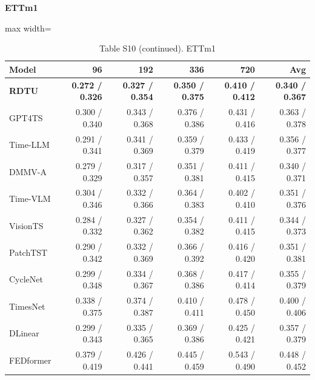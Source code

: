 \begin{table}[H]\centering\small
\caption*{Table S10 (continued). ETTm1}
\textbf{ETTm1}\par\smallskip
\begin{adjustbox}{max width=\linewidth}\begin{tabular}{lrrrrr}\toprule
\textbf{Model} & \textbf{96} & \textbf{192} & \textbf{336} & \textbf{720} & \textbf{Avg}\\\midrule
\rowcolor{blue!5}
\textbf{RDTU} & \textbf{0.272 / 0.326} & \textbf{0.327 / 0.354} & \textbf{0.350 / 0.375} & \textbf{0.410 / 0.412} & \textbf{0.340 / 0.367}\\
GPT4TS & 0.300 / 0.340 & 0.343 / 0.368 & 0.376 / 0.386 & 0.431 / 0.416 & 0.363 / 0.378\\
Time-LLM & 0.291 / 0.341 & 0.341 / 0.369 & 0.359 / 0.379 & 0.433 / 0.419 & 0.356 / 0.377\\
DMMV-A & 0.279 / 0.329 & 0.317 / 0.357 & 0.351 / 0.381 & 0.411 / 0.415 & 0.340 / 0.371\\
Time-VLM & 0.304 / 0.346 & 0.332 / 0.366 & 0.364 / 0.383 & 0.402 / 0.410 & 0.351 / 0.376\\
VisionTS & 0.284 / 0.332 & 0.327 / 0.362 & 0.354 / 0.382 & 0.411 / 0.415 & 0.344 / 0.373\\
PatchTST & 0.290 / 0.342 & 0.332 / 0.369 & 0.366 / 0.392 & 0.416 / 0.420 & 0.351 / 0.381\\
CycleNet & 0.299 / 0.348 & 0.334 / 0.367 & 0.368 / 0.386 & 0.417 / 0.414 & 0.355 / 0.379\\
TimesNet & 0.338 / 0.375 & 0.374 / 0.387 & 0.410 / 0.411 & 0.478 / 0.450 & 0.400 / 0.406\\
DLinear & 0.299 / 0.343 & 0.335 / 0.365 & 0.369 / 0.386 & 0.425 / 0.421 & 0.357 / 0.379\\
FEDformer & 0.379 / 0.419 & 0.426 / 0.441 & 0.445 / 0.459 & 0.543 / 0.490 & 0.448 / 0.452\\
\bottomrule\end{tabular}\end{adjustbox}\end{table}
